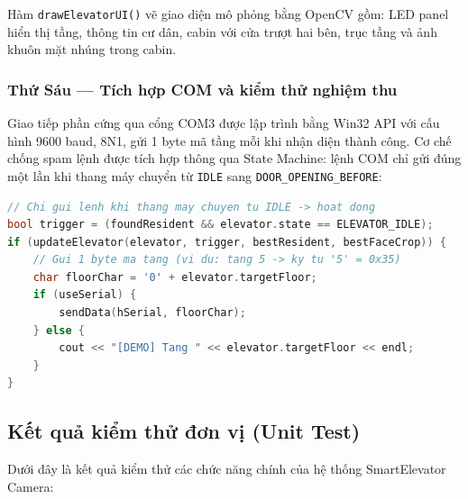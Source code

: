 \documentclass[12pt,a4paper]{article}
\begin{document}
Hàm \texttt{drawElevatorUI()} vẽ giao diện mô phỏng bằng OpenCV gồm: LED panel hiển thị tầng, thông tin cư dân, cabin với cửa trượt hai bên, trục tầng và ảnh khuôn mặt nhúng trong cabin.

\subsubsection{Thứ Sáu --- Tích hợp COM và kiểm thử nghiệm thu}

Giao tiếp phần cứng qua cổng COM3 được lập trình bằng Win32 API với cấu hình 9600 baud, 8N1, gửi 1 byte mã tầng mỗi khi nhận diện thành công. Cơ chế chống spam lệnh được tích hợp thông qua State Machine: lệnh COM chỉ gửi đúng một lần khi thang máy chuyển từ \texttt{IDLE} sang \texttt{DOOR\_OPENING\_BEFORE}:

\begin{lstlisting}[language=C++, caption={Gửi lệnh COM một lần duy nhất, chống spam}]
// Chi gui lenh khi thang may chuyen tu IDLE -> hoat dong
bool trigger = (foundResident && elevator.state == ELEVATOR_IDLE);
if (updateElevator(elevator, trigger, bestResident, bestFaceCrop)) {
    // Gui 1 byte ma tang (vi du: tang 5 -> ky tu '5' = 0x35)
    char floorChar = '0' + elevator.targetFloor;
    if (useSerial) {
        sendData(hSerial, floorChar);
    } else {
        cout << "[DEMO] Tang " << elevator.targetFloor << endl;
    }
}
\end{lstlisting}

\subsection{Kết quả kiểm thử đơn vị (Unit Test)}

Dưới đây là kết quả kiểm thử các chức năng chính của hệ thống SmartElevator Camera:
\end{document}
